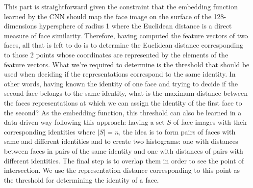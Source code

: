 This part is straightforward given the constraint that the embedding function learned by the CNN should map the face image on the surface of the 128-dimensions hypersphere of radius 1 where the Euclidean distance is a direct measure of face similarity. Therefore, having computed the feature vectors of two faces, all that is left to do is to determine the Euclidean distance corresponding to those 2 points whose coordinates are represented by the elements of the feature vectors. 
What we're required to determine is the threshold that should be used when deciding if the representations correspond to the same identity. In other words, having known the identity of one face and trying to decide if the second face belongs to the same identity, what is the maximum distance between the faces representations at which we can assign the identity of the first face to the second? As the embedding function, this threshold can also be learned in a data driven way following this approach: having a set $S$ of face images with their corresponding identities where $|S| = n$, the idea is to form pairs of faces with same and different identities and to create two histograms: one with distances between faces in pairs of the same identity and one with distances of pairs with different identities. The final step is to overlap them in order to see the point of intersection. We use the representation distance corresponding to this point as the threshold for determining the identity of a face.

